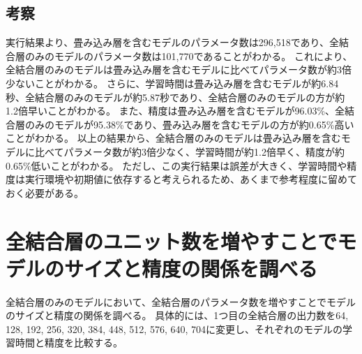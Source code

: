 \documentclass{ltjsarticle}
\begin{document}
    \subsection{考察}
        実行結果より、畳み込み層を含むモデルのパラメータ数は296,518であり、全結合層のみのモデルのパラメータ数は101,770であることがわかる。
        これにより、全結合層のみのモデルは畳み込み層を含むモデルに比べてパラメータ数が約3倍少ないことがわかる。
        さらに、学習時間は畳み込み層を含むモデルが約6.84秒、全結合層のみのモデルが約5.87秒であり、全結合層のみのモデルの方が約1.2倍早いことがわかる。
        また、精度は畳み込み層を含むモデルが96.03\%、全結合層のみのモデルが95.38\%であり、畳み込み層を含むモデルの方が約0.65\%高いことがわかる。
        以上の結果から、全結合層のみのモデルは畳み込み層を含むモデルに比べてパラメータ数が約3倍少なく、学習時間が約1.2倍早く、精度が約0.65\%低いことがわかる。
        ただし、この実行結果は誤差が大きく、学習時間や精度は実行環境や初期値に依存すると考えられるため、あくまで参考程度に留めておく必要がある。

\section{全結合層のユニット数を増やすことでモデルのサイズと精度の関係を調べる}
    全結合層のみのモデルにおいて、全結合層のパラメータ数を増やすことでモデルのサイズと精度の関係を調べる。
    具体的には、1つ目の全結合層の出力数を64, 128, 192, 256, 320, 384, 448, 512, 576, 640, 704に変更し、それぞれのモデルの学習時間と精度を比較する。
\end{document}
